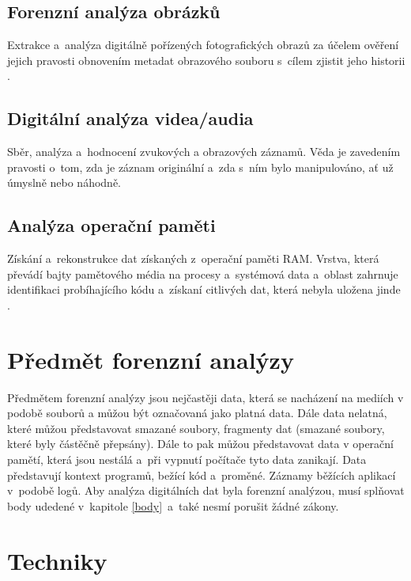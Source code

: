 \documentclass[thesis=B,czech]{FITthesis}[2012/06/26]
\begin{document}
\subsection{Forenzní analýza obrázků}
Extrakce a~analýza digitálně pořízených fotografických obrazů za účelem ověření jejich pravosti obnovením metadat obrazového souboru s~cílem zjistit jeho historii \cite{for_types}.

\subsection{Digitální analýza videa/audia}
Sběr, analýza a~hodnocení zvukových a obrazových záznamů. Věda je zavedením pravosti o~tom, zda je záznam originální a~zda s~ním bylo manipulováno, ať už úmyslně nebo náhodně.

\subsection{Analýza operační paměti}
Získání a~rekonstrukce dat získaných z~operační paměti RAM. Vrstva, která převádí bajty pamětového média na procesy a~systémová data a~oblast zahrnuje identifikaci probíhajícího kódu a~získaní citlivých dat, která nebyla uložena jinde \cite{carrier2003defining}. 




\section{Předmět forenzní analýzy}

Předmětem forenzní analýzy jsou nejčastěji data, která se nacházení na mediích v podobě souborů a můžou být označovaná jako platná data. Dále data nelatná, které můžou představovat smazané soubory, fragmenty dat (smazané soubory, které byly částěčně přepsány). Dále to pak můžou představovat data v operační pamětí, která jsou nestálá a~při vypnutí počítače tyto data zanikají. Data představují kontext programů, bežící kód a~proměné. Záznamy běžících aplikací v~podobě logů. 
Aby analýza digitálních dat byla forenzní analýzou, musí splňovat body udedené v~kapitole \ref{body}~a~také nesmí porušit žádné zákony.



\section{Techniky}
\end{document}
